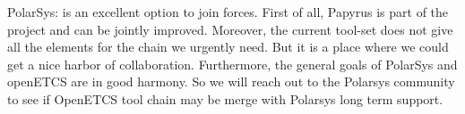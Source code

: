 
 PolarSys: is an excellent option to join forces.  First of all,
 Papyrus is part of the project and can be jointly improved.
 Moreover, the current tool-set does not give all the elements for the
 chain we urgently need. But it is a place where we could get 
 a nice harbor of collaboration. Furthermore,
 the general goals of PolarSys and openETCS are in good harmony. 
So we will reach out to the Polarsys
 community to see if  OpenETCS tool chain  may be merge with Polarsys
 long term support.  
